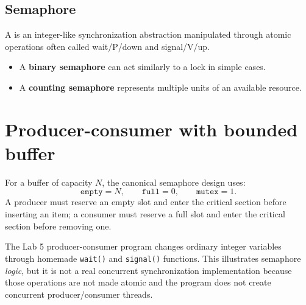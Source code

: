 \subsection{Semaphore}
A  is an integer-like synchronization abstraction manipulated through atomic operations often called wait/P/down and signal/V/up.
\begin{itemize}
  \item A \textbf{binary semaphore} can act similarly to a lock in simple cases.
  \item A \textbf{counting semaphore} represents multiple units of an available resource.
\end{itemize}

\section{Producer-consumer with bounded buffer}
For a buffer of capacity $N$, the canonical semaphore design uses:
\[
\texttt{empty}=N,\qquad \texttt{full}=0,\qquad \texttt{mutex}=1.
\]
A producer must reserve an empty slot and enter the critical section before inserting an item; a consumer must reserve a full slot and enter the critical section before removing one.

\begin{mlfigure}
\end{mlfigure}

\begin{pitfall}
The Lab 5 producer-consumer program changes ordinary integer variables through homemade \texttt{wait()} and \texttt{signal()} functions. This illustrates semaphore \emph{logic}, but it is not a real concurrent synchronization implementation because those operations are not made atomic and the program does not create concurrent producer/consumer threads.
\end{pitfall}

